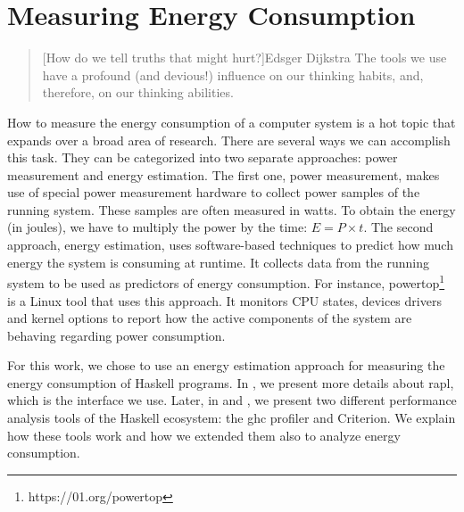 \chapter{Measuring Energy Consumption}\label{chp:tools}

\begin{quotation}[How do we tell truths that might hurt?]{Edsger Dijkstra}
The tools we use have a profound (and devious!) influence on our thinking habits, and, therefore, on our thinking abilities.
\end{quotation}

How to measure the energy consumption of a computer system is a hot topic that expands over a broad area of research. There are several ways we can accomplish this task. They can be categorized into two separate approaches: power measurement and energy estimation. The first one, power measurement, makes use of special power measurement hardware to collect power samples of the running system. These samples are often measured in watts. To obtain the energy (in joules), we have to multiply the power by the time: $E = P \times t$.
The second approach, energy estimation, uses software-based techniques to predict how much energy the system is consuming at runtime. It collects data from the running system to be used as predictors of energy consumption. For instance, powertop\footnote{https://01.org/powertop} is a Linux tool that uses this approach. It monitors CPU states, devices drivers and kernel options to report how the active components of the system are behaving regarding power consumption.

For this work, we chose to use an energy estimation approach for measuring the energy consumption of Haskell programs. In , we present more details about \acs{rapl}, which is the interface we use. Later, in  and , we present two different performance analysis tools of the Haskell ecosystem: the \acs{ghc} profiler and Criterion. We explain how these tools work and how we extended them also to analyze energy consumption.

